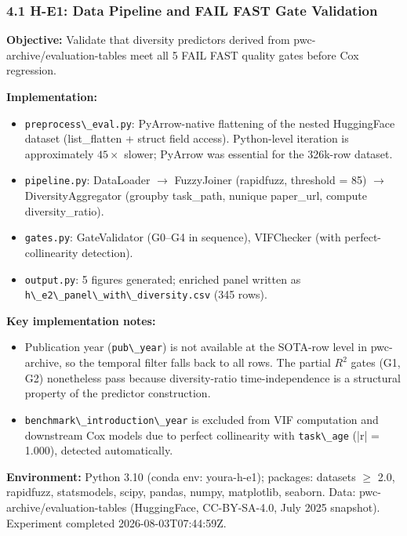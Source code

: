
\subsubsection{4.1 H-E1: Data Pipeline and FAIL FAST Gate Validation}

\textbf{Objective:} Validate that diversity predictors derived from pwc-archive/evaluation-tables meet all 5 FAIL FAST quality gates before Cox regression.

\textbf{Implementation:}
\begin{itemize}
\item \texttt{preprocess\textbackslash \_eval.py}: PyArrow-native flattening of the nested HuggingFace dataset (list\_flatten + struct field access). Python-level iteration is approximately $45\times$ slower; PyArrow was essential for the 326k-row dataset.
\item \texttt{pipeline.py}: DataLoader $\rightarrow$ FuzzyJoiner (rapidfuzz, threshold = 85) $\rightarrow$ DiversityAggregator (groupby task\_path, nunique paper\_url, compute diversity\_ratio).
\item \texttt{gates.py}: GateValidator (G0--G4 in sequence), VIFChecker (with perfect-collinearity detection).
\item \texttt{output.py}: 5 figures generated; enriched panel written as \texttt{h\textbackslash \_e2\textbackslash \_panel\textbackslash \_with\textbackslash \_diversity.csv} (345 rows).
\end{itemize}

\textbf{Key implementation notes:}
\begin{itemize}
\item Publication year (\texttt{pub\textbackslash \_year}) is not available at the SOTA-row level in pwc-archive, so the temporal filter falls back to all rows. The partial $R^2$ gates (G1, G2) nonetheless pass because diversity-ratio time-independence is a structural property of the predictor construction.
\item \texttt{benchmark\textbackslash \_introduction\textbackslash \_year} is excluded from VIF computation and downstream Cox models due to perfect collinearity with \texttt{task\textbackslash \_age} (|r| = 1.000), detected automatically.
\end{itemize}

\textbf{Environment:} Python 3.10 (conda env: youra-h-e1); packages: datasets $\geq$ 2.0, rapidfuzz, statsmodels, scipy, pandas, numpy, matplotlib, seaborn. Data: pwc-archive/evaluation-tables (HuggingFace, CC-BY-SA-4.0, July 2025 snapshot). Experiment completed 2026-08-03T07:44:59Z.

